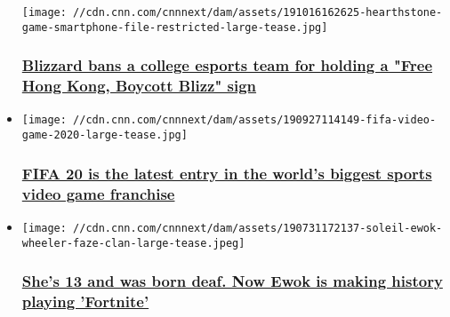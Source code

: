\begin{itemize}
  \texttt{[image: //cdn.cnn.com/cnnnext/dam/assets/191016162625-hearthstone-game-smartphone-file-restricted-large-tease.jpg]}

  \hypertarget{blizzard-bans-a-college-esports-team-for-holding-a-free-hong-kong-boycott-blizz-sign}{%
  \subsubsection{\texorpdfstring{\href{/2019/10/16/tech/blizzard-hong-kong-american-students-ban/index.html}{Blizzard
  bans a college esports team for holding a "Free Hong Kong, Boycott
  Blizz"
  sign}}{Blizzard bans a college esports team for holding a "Free Hong Kong, Boycott Blizz" sign}}\label{blizzard-bans-a-college-esports-team-for-holding-a-free-hong-kong-boycott-blizz-sign}}
\item
  \href{/2019/09/27/tech/fifa-20/index.html}{}

  \texttt{[image: //cdn.cnn.com/cnnnext/dam/assets/190927114149-fifa-video-game-2020-large-tease.jpg]}

  \hypertarget{fifa-20-is-the-latest-entry-in-the-worlds-biggest-sports-video-game-franchise}{%
  \subsubsection{\texorpdfstring{\href{/2019/09/27/tech/fifa-20/index.html}{FIFA
  20 is the latest entry in the world's biggest sports video game
  franchise}}{FIFA 20 is the latest entry in the world's biggest sports video game franchise}}\label{fifa-20-is-the-latest-entry-in-the-worlds-biggest-sports-video-game-franchise}}
\item
  \href{/2019/08/01/tech/ewok-fortnite-soleil-wheeler/index.html}{}

  \texttt{[image: //cdn.cnn.com/cnnnext/dam/assets/190731172137-soleil-ewok-wheeler-faze-clan-large-tease.jpeg]}

  \hypertarget{shes-13-and-was-born-deaf-now-ewok-is-making-history-playing-fortnite}{%
  \subsubsection{\texorpdfstring{\href{/2019/08/01/tech/ewok-fortnite-soleil-wheeler/index.html}{She's
  13 and was born deaf. Now Ewok is making history playing
  'Fortnite'}}{She's 13 and was born deaf. Now Ewok is making history playing 'Fortnite'}}\label{shes-13-and-was-born-deaf-now-ewok-is-making-history-playing-fortnite}}
\end{itemize}

